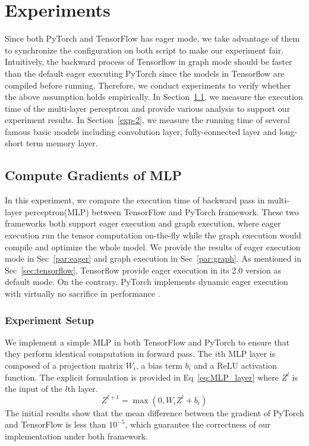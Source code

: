 \documentclass[12pt,twocolumn,letterpaper]{extarticle}
\begin{document}
\section{Experiments} \label{sec-experiment}

Since both PyTorch and TensorFlow has eager mode, we take advantage of them to synchronize the configuration on both script to make our experiment fair. Intuitively, the backward process of Tensorflow in graph mode should be faster than the default eager executing PyTorch since the models in Tensorflow are compiled before running. Therefore, we conduct experiments to verify whether the above assumption holds empirically. In Section~\ref{sec:exp-1}, we measure the execution time of the multi-layer perceptron and provide various analysis to support our experiment results. In Section~\ref{exp-2}, we measure the running time of several famous basic models including convolution layer, fully-connected layer and long-short term memory layer.

\subsection{Compute Gradients of MLP} \label{sec:exp-1}

In this experiment, we compare the execution time of backward pass in multi-layer perceptron\;(MLP) between TensorFlow and PyTorch framework. These two frameworks both support eager execution and graph execution, where eager execution run the tensor computation on-the-fly while the graph execution would compile and optimize the whole model. We provide the results of eager execution mode in Sec~\ref{par:eager} and graph execution in Sec~\ref{par:graph}. As mentioned in Sec~\ref{sec:tensorflow}, Tensorflow provide eager execution in its 2.0 version as default mode. On the contrary, PyTorch implements dynamic eager execution with virtually no sacrifice in performance \cite{NEURIPS2019_bdbca288}.

\subsubsection{Experiment Setup}
We implement a simple MLP in both TensorFlow and PyTorch to ensure that they perform identical computation in forward pass. The  $i$th MLP layer is composed of a projection matrix $W_i$, a bias term $b_i$ and a ReLU activation function. The explicit formulation is provided in Eq~\ref{eq:MLP_layer} where $Z^l$ is the input of the $l$th layer.
\begin{equation} \label{eq:MLP_layer}
    Z^{l+1} = \max\left(0, W_i Z^{l} + b_i\right)
\end{equation}
The initial results show that the mean difference between the gradient of PyTorch and TensorFlow is less than $10^{-5}$, which guarantee the correctness of our implementation under both framework.
\end{document}
